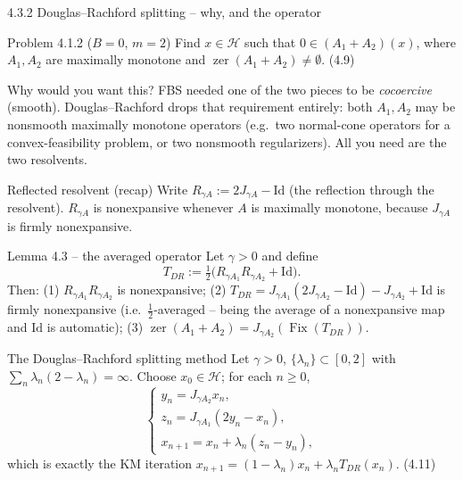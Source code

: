 \documentclass[aspectratio=169,10pt]{beamer}
\newcommand{\Id}{\mathrm{Id}}
\newcommand{\Fix}{\operatorname{Fix}}
\newcommand{\zer}{\operatorname{zer}}
\begin{document}
\begin{frame}[allowframebreaks]{4.3.2 Douglas--Rachford splitting -- why, and the operator}
  \begin{block}{Problem 4.1.2 ($B=0$, $m=2$)}
    Find $x\in\mathcal H$ such that $0\in(A_1+A_2)(x)$, where $A_1,A_2$ are maximally monotone and $\zer(A_1+A_2)\ne\emptyset$. (4.9)
  \end{block}
  \begin{block}{Why would you want this?}
    FBS needed one of the two pieces to be \emph{cocoercive} (smooth). Douglas--Rachford drops that requirement entirely: both $A_1,A_2$ may be nonsmooth maximally monotone operators (e.g.\ two normal-cone operators for a convex-feasibility problem, or two nonsmooth regularizers). All you need are the two resolvents.
  \end{block}
  \begin{block}{Reflected resolvent (recap)}
    Write $R_{\gamma A}:=2J_{\gamma A}-\Id$ (the reflection through the resolvent). $R_{\gamma A}$ is nonexpansive whenever $A$ is maximally monotone, because $J_{\gamma A}$ is firmly nonexpansive.
  \end{block}

  \framebreak

  \begin{block}{Lemma 4.3 -- the averaged operator}
    Let $\gamma>0$ and define
    \[
      T_{DR} := \tfrac12\big(R_{\gamma A_1}R_{\gamma A_2}+\Id\big).
    \]
    Then: (1) $R_{\gamma A_1}R_{\gamma A_2}$ is nonexpansive; (2) $T_{DR}=J_{\gamma A_1}(2J_{\gamma A_2}-\Id)-J_{\gamma A_2}+\Id$ is firmly nonexpansive (i.e.\ $\tfrac12$-averaged -- being the average of a nonexpansive map and $\Id$ is automatic); (3) $\zer(A_1+A_2)=J_{\gamma A_2}(\Fix(T_{DR}))$.
  \end{block}
  \begin{block}{The Douglas--Rachford splitting method}
    Let $\gamma>0$, $\{\lambda_n\}\subset[0,2]$ with $\sum_n\lambda_n(2-\lambda_n)=\infty$. Choose $x_0\in\mathcal H$; for each $n\ge0$,
    \begin{equation*}
      \begin{cases}
        y_n = J_{\gamma A_2}x_n, \\
        z_n = J_{\gamma A_1}(2y_n-x_n), \\
        x_{n+1} = x_n+\lambda_n(z_n-y_n),
      \end{cases} \tag{4.10}
    \end{equation*}
    which is exactly the KM iteration $x_{n+1}=(1-\lambda_n)x_n+\lambda_n T_{DR}(x_n)$. (4.11)
  \end{block}


\end{frame}
\end{document}
